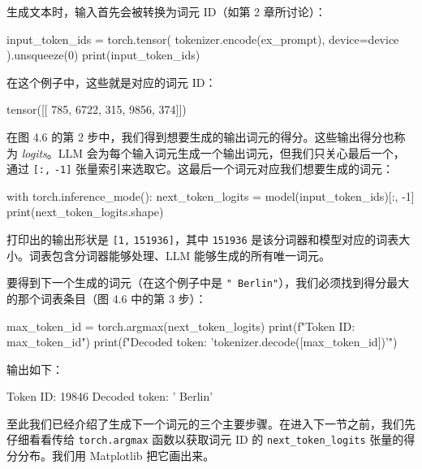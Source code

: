 生成文本时，输入首先会被转换为词元 ID（如第 2 章所讨论）：

\begin{codebox}
input_token_ids = torch.tensor(
    tokenizer.encode(ex_prompt), device=device
).unsqueeze(0)
print(input_token_ids)
\end{codebox}

在这个例子中，这些就是对应的词元 ID：

\begin{codebox}
tensor([[ 785, 6722,  315, 9856,  374]])
\end{codebox}

在图 4.6 的第 2 步中，我们得到想要生成的输出词元的得分。这些输出得分也称为 \emph{logits}。LLM 会为每个输入词元生成一个输出词元，但我们只关心最后一个，通过 \texttt{[:,} \texttt{-1]} 张量索引来选取它。这最后一个词元对应我们想要生成的词元：

\begin{codebox}
with torch.inference_mode():
    next_token_logits = model(input_token_ids)[:, -1]
print(next_token_logits.shape)
\end{codebox}

打印出的输出形状是 \texttt{[1,} \texttt{151936]}，其中 \texttt{151936} 是该分词器和模型对应的词表大小。词表包含分词器能够处理、LLM 能够生成的所有唯一词元。

要得到下一个生成的词元（在这个例子中是 \texttt{"}\texttt{ Berlin}\texttt{"}），我们必须找到得分最大的那个词表条目（图 4.6 中的第 3 步）：

\begin{codebox}
max_token_id = torch.argmax(next_token_logits)
print(f"Token ID: {max_token_id}")
print(f"Decoded token: '{tokenizer.decode([max_token_id])}'")
\end{codebox}

输出如下：

\begin{codebox}
Token ID: 19846
Decoded token: ' Berlin'
\end{codebox}

至此我们已经介绍了生成下一个词元的三个主要步骤。在进入下一节之前，我们先仔细看看传给 \texttt{torch.argmax} 函数以获取词元 ID 的 \texttt{next\_token\_logits} 张量的得分分布。我们用 Matplotlib 把它画出来。

